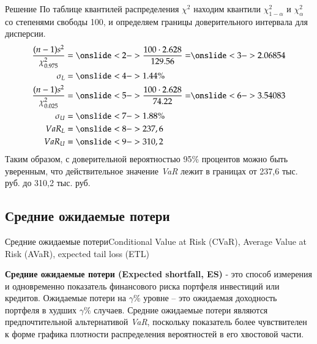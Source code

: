 \documentclass[financial_risks_lectures.tex]{subfiles}
\begin{document}
\begin{frame}[shrink=15]
\begin{exampleblock}{Решение}
По таблице квантилей распределения $\chi^2$ находим квантили $\chi_{1-\alpha}^2$ и $\chi_{\alpha}^2$ со степенями свободы 100, и определяем границы доверительного интервала для дисперсии.
\begin{align*}
\frac{(n-1)s^2}{\chi_{0.975}^2} &=\onslide<2->{\frac{100 \cdot 2.628}{129.56}=}\onslide<3->{2.06854}\\
\sigma_L&=\onslide<4->{1.44\%}\\
\frac{(n-1)s^2}{\chi_{0.025}^2}&=\onslide<5->{\frac{100 \cdot 2.628}{74.22}=}\onslide<6->{3.54083}\\
\sigma_U&=\onslide<7->{1.88\%}\\
VaR_L&=\onslide<8->{237,6}\\
VaR_U&=\onslide<9->{310,2}
\end{align*}
Таким образом, с доверительной вероятностью 95\% процентов можно быть уверенным, что действительное значение \textit{VaR} лежит в границах от 237,6 тыс. руб. до 310,2 тыс. руб.

\end{exampleblock}
\end{frame}
\subsection{Средние ожидаемые потери}
\begin{frame}{Средние ожидаемые потери}{Conditional Value at Risk (CVaR), Average Value at Risk (AVaR), expected tail loss (ETL)}
\begin{block}{\textbf{Средние ожидаемые потери (Expected shortfall, ES)}}
- это способ измерения и одновременно показатель финансового риска портфеля инвестиций или кредитов. Ожидаемые потери на $\gamma\%$ уровне – это ожидаемая доходность портфеля в худших $\gamma\%$ случаев. Средние ожидаемые потери являются предпочтительной альтернативой \textit{VaR}, поскольку показатель более чувствителен к форме графика плотности распределения вероятностей в его хвостовой части.
\end{block}
\end{frame}
\end{document}
